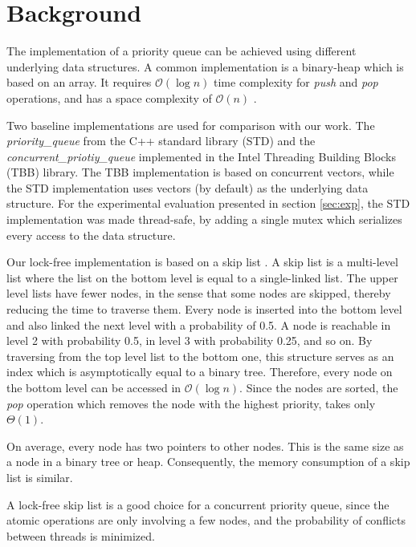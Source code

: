 \section{Background}
\label{sec:background}

The implementation of a priority queue can be achieved using different underlying data structures.
A common implementation is a binary-heap which is based on an array. It requires $\mathcal{O}(\log{}n)$ time complexity for \textit{push} and \textit{pop} operations, and has a space complexity of $\mathcal{O}(n)$ .

Two baseline implementations are used for comparison with our work.
The \textit{priority\_queue} from the C++ standard library (STD) and the \textit{concurrent\_priotiy\_queue} implemented in the Intel Threading Building Blocks (TBB) library.
The TBB implementation is based on concurrent vectors, while the STD implementation uses vectors (by default) as the underlying data structure.
For the experimental evaluation presented in section \ref{sec:exp}, the STD implementation was made thread-safe, by adding a single mutex which serializes every access to the data structure.

Our lock-free implementation is based on a skip list \cite{Pugh:1990:SLP:78973.78977}.
A skip list is a multi-level list where the list on the bottom level is equal to a single-linked list.
The upper level lists have fewer nodes, in the sense that some nodes are skipped, thereby reducing the time to traverse them.
Every node is inserted into the bottom level and also linked the next level with a probability of 0.5.
A node is reachable in level 2 with probability 0.5, in level 3 with probability 0.25, and so on. By traversing from the top level list to the bottom one, this structure serves as an index which is asymptotically equal to a binary tree.
Therefore, every node on the bottom level can be accessed in $\mathcal{O}(\log{}n)$.
Since the nodes are sorted, the \textit{pop} operation which removes the node with the highest priority, takes only $\Theta(1)$.

On average, every node has two pointers to other nodes. This is the same size as a node in a binary tree or heap.
Consequently, the memory consumption of a skip list is similar.

A lock-free skip list is a good choice for a concurrent priority queue, since the atomic operations are only involving a few nodes, and the probability of conflicts between threads is minimized.